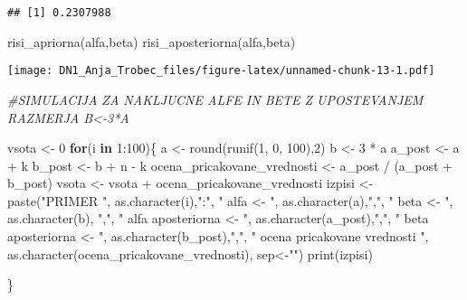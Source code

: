 \documentclass[
]{article}
\newenvironment{Shaded}{\begin{snugshade}}{\end{snugshade}}
\newcommand{\CommentTok}[1]{\textcolor[rgb]{0.56,0.35,0.01}{\textit{#1}}}
\newcommand{\ControlFlowTok}[1]{\textcolor[rgb]{0.13,0.29,0.53}{\textbf{#1}}}
\newcommand{\DecValTok}[1]{\textcolor[rgb]{0.00,0.00,0.81}{#1}}
\newcommand{\FunctionTok}[1]{\textcolor[rgb]{0.00,0.00,0.00}{#1}}
\newcommand{\NormalTok}[1]{#1}
\newcommand{\OtherTok}[1]{\textcolor[rgb]{0.56,0.35,0.01}{#1}}
\newcommand{\SpecialCharTok}[1]{\textcolor[rgb]{0.00,0.00,0.00}{#1}}
\newcommand{\StringTok}[1]{\textcolor[rgb]{0.31,0.60,0.02}{#1}}
\begin{document}
\begin{verbatim}
## [1] 0.2307988
\end{verbatim}

\begin{Shaded}
\begin{Highlighting}[]
\FunctionTok{risi\_apriorna}\NormalTok{(alfa,beta)}
\FunctionTok{risi\_aposteriorna}\NormalTok{(alfa,beta)}
\end{Highlighting}
\end{Shaded}

\texttt{[image: DN1\_Anja\_Trobec\_files/figure-latex/unnamed-chunk-13-1.pdf]}

\begin{Shaded}
\begin{Highlighting}[]
\CommentTok{\#SIMULACIJA ZA NAKLJUCNE ALFE IN BETE Z UPOSTEVANJEM RAZMERJA B\textless{}{-}3*A}

\NormalTok{vsota }\OtherTok{\textless{}{-}} \DecValTok{0}
\ControlFlowTok{for}\NormalTok{(i }\ControlFlowTok{in} \DecValTok{1}\SpecialCharTok{:}\DecValTok{100}\NormalTok{)\{}
\NormalTok{  a }\OtherTok{\textless{}{-}} \FunctionTok{round}\NormalTok{(}\FunctionTok{runif}\NormalTok{(}\DecValTok{1}\NormalTok{, }\DecValTok{0}\NormalTok{, }\DecValTok{100}\NormalTok{),}\DecValTok{2}\NormalTok{)}
\NormalTok{  b }\OtherTok{\textless{}{-}} \DecValTok{3} \SpecialCharTok{*}\NormalTok{ a}
\NormalTok{  a\_post }\OtherTok{\textless{}{-}}\NormalTok{ a }\SpecialCharTok{+}\NormalTok{ k}
\NormalTok{  b\_post }\OtherTok{\textless{}{-}}\NormalTok{ b }\SpecialCharTok{+}\NormalTok{ n }\SpecialCharTok{{-}}\NormalTok{ k}
\NormalTok{  ocena\_pricakovane\_vrednosti }\OtherTok{\textless{}{-}}\NormalTok{ a\_post }\SpecialCharTok{/}\NormalTok{ (a\_post }\SpecialCharTok{+}\NormalTok{ b\_post)}
\NormalTok{  vsota }\OtherTok{\textless{}{-}}\NormalTok{ vsota }\SpecialCharTok{+}\NormalTok{ ocena\_pricakovane\_vrednosti}
\NormalTok{  izpisi }\OtherTok{\textless{}{-}} \FunctionTok{paste}\NormalTok{(}\StringTok{"PRIMER "}\NormalTok{, }\FunctionTok{as.character}\NormalTok{(i),}\StringTok{":"}\NormalTok{, }
        \StringTok{"  alfa \textless{}{-}  "}\NormalTok{, }\FunctionTok{as.character}\NormalTok{(a),}\StringTok{","}\NormalTok{, }
        \StringTok{" beta \textless{}{-} "}\NormalTok{, }\FunctionTok{as.character}\NormalTok{(b), }\StringTok{","}\NormalTok{,}
        \StringTok{" alfa aposteriorna \textless{}{-}  "}\NormalTok{, }\FunctionTok{as.character}\NormalTok{(a\_post),}\StringTok{","}\NormalTok{,}
        \StringTok{" beta aposteriorna \textless{}{-} "}\NormalTok{, }\FunctionTok{as.character}\NormalTok{(b\_post),}\StringTok{","}\NormalTok{,}
        \StringTok{" ocena pricakovane vrednosti "}\NormalTok{, }\FunctionTok{as.character}\NormalTok{(ocena\_pricakovane\_vrednosti), sep}\OtherTok{\textless{}{-}}\StringTok{""}\NormalTok{)}
  \FunctionTok{print}\NormalTok{(izpisi)}
  
\NormalTok{\}}
\end{Highlighting}
\end{Shaded}
\end{document}
